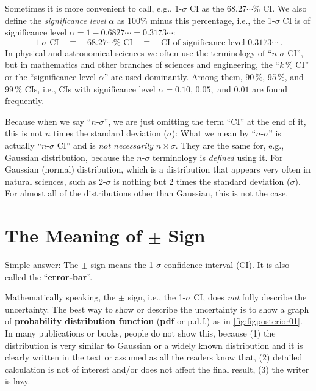 Sometimes it is more convenient to call, e.g., 1-$ \sigma $ CI as the $ 68.27\cdots \% $ CI. We also define the \textit{significance level} $ \alpha $ as 100\% minus this percentage, i.e., the 1-$ \sigma $ CI is of significance level $ \alpha = 1 - 0.6827\cdots = 0.3173\cdots $:
\begin{equation}
  \text{1-}\sigma \text{ CI}
  \quad \equiv \quad 
  68.27\cdots \% \text{ CI}
  \quad \equiv \quad 
  \text{CI of significance level } 0.3173 \cdots ~.
\end{equation}
In physical and astronomical sciences we often use the terminology of ``$ n $-$ \sigma $ CI'', but in mathematics and other branches of sciences and engineering, the ``$ k $\,\% CI'' or the ``significance level $ \alpha $'' are used dominantly. Among them, 90\,\%, 95\,\%, and 99\,\% CIs, i.e., CIs with significance level $ \alpha = 0.10,\, 0.05,$ and $ 0.01 $ are found frequently.

Because when we say ``$ n $-$ \sigma $'', we are just omitting the term ``CI'' at the end of it, this is not $ n $ times the standard deviation ($ \sigma $): What we mean by ``$ n $-$ \sigma $'' is actually ``$ n $-$ \sigma $ CI'' and is \textit{not necessarily} $ n \times \sigma $. They are the same for, e.g., Gaussian distribution, because the $ n $-$ \sigma $ terminology is \textit{defined} using it. For Gaussian (normal) distribution, which is a distribution that appears very often in natural sciences, such as 2-$ \sigma $ is nothing but 2 times the standard deviation ($ \sigma $). For almost all of the distributions other than Gaussian, this is not the case.



\section{The Meaning of $ \pm $ Sign}
Simple answer: The $ \pm $ sign means the 1-$ \sigma $ confidence interval (CI). It is also called the ``\textbf{error-bar}''. 

Mathematically speaking, the $ \pm $ sign, i.e., the 1-$ \sigma $ CI, does \textit{not} fully describe the uncertainty. The best way to show or describe the uncertainty is to show a graph of \textbf{probability distribution function} (\textbf{pdf} or p.d.f.) as in \cref{fig:figposterior01}. In many publications or books, people do not show this, because (1) the distribution is very similar to Gaussian or a widely known distribution and it is clearly written in the text or assumed as all the readers know that, (2) detailed calculation is not of interest and/or does not affect the final result, (3) the writer is lazy. 

